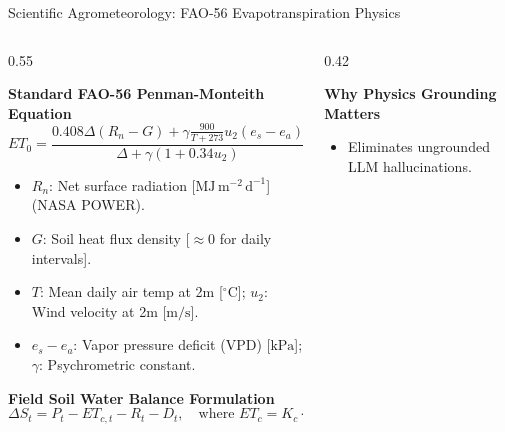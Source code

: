 \documentclass[aspectratio=169,10pt]{beamer}
\begin{document}
\begin{frame}{Scientific Agrometeorology: FAO-56 Evapotranspiration Physics}
    \begin{columns}[T]
        \begin{column}{0.55\textwidth}
            \begin{block}{\textbf{Standard FAO-56 Penman-Monteith Equation}}
                \footnotesize
                \begin{equation*}
                    ET_0 = \frac{0.408 \Delta (R_n - G) + \gamma \frac{900}{T + 273} u_2 (e_s - e_a)}{\Delta + \gamma (1 + 0.34 u_2)}
                \end{equation*}
                \scriptsize
                \begin{itemize}
                    \item $R_n$: Net surface radiation [$\text{MJ}\,\text{m}^{-2}\,\text{d}^{-1}$] (NASA POWER).
                    \item $G$: Soil heat flux density [$\approx 0$ for daily intervals].
                    \item $T$: Mean daily air temp at 2m [${}^\circ\text{C}$]; $u_2$: Wind velocity at 2m [$\text{m/s}$].
                    \item $e_s - e_a$: Vapor pressure deficit (VPD) [$\text{kPa}$]; $\gamma$: Psychrometric constant.
                \end{itemize}
            \end{block}
            \begin{block}{\textbf{Field Soil Water Balance Formulation}}
                \footnotesize
                \begin{equation*}
                    \Delta S_t = P_t - ET_{c,t} - R_t - D_t, \quad \text{where } ET_c = K_c \cdot ET_0
                \end{equation*}
            \end{block}
        \end{column}
        \begin{column}{0.42\textwidth}
            \begin{exampleblock}{\textbf{Why Physics Grounding Matters}}
                \footnotesize
                \begin{itemize}
                    \item Eliminates ungrounded LLM hallucinations.

\end{itemize}
\end{exampleblock}
\end{column}
\end{columns}
\end{frame}
\end{document}

